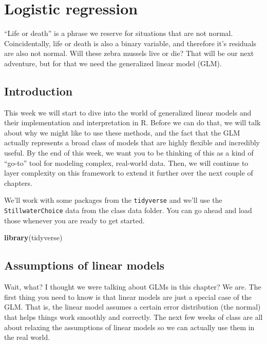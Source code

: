 \documentclass[
]{book}
\newenvironment{Shaded}{\begin{snugshade}}{\end{snugshade}}
\newcommand{\KeywordTok}[1]{\textcolor[rgb]{0.13,0.29,0.53}{\textbf{#1}}}
\newcommand{\NormalTok}[1]{#1}
\begin{document}
\hypertarget{Chapter12}{%
\chapter{Logistic regression}\label{Chapter12}}

``Life or death'' is a phrase we reserve for situations that are not normal. Coincidentally, life or death is also a binary variable, and therefore it's residuals are also not normal. Will these zebra mussels live or die? That will be our next adventure, but for that we need the generalized linear model (GLM).

\hypertarget{intro12}{%
\section{Introduction}\label{intro12}}

This week we will start to dive into the world of generalized linear models and their implementation and interpretation in R. Before we can do that, we will talk about why we might like to use these methods, and the fact that the GLM actually represents a broad class of models that are highly flexible and incredibly useful. By the end of this week, we want you to be thinking of this as a kind of ``go-to'' tool for modeling complex, real-world data. Then, we will continue to layer complexity on this framework to extend it further over the next couple of chapters.

We'll work with some packages from the \texttt{tidyverse} and we'll use the \texttt{StillwaterChoice} data from the class data folder. You can go ahead and load those whenever you are ready to get started.

\begin{Shaded}
\begin{Highlighting}[]
\KeywordTok{library}\NormalTok{(tidyverse)}
\end{Highlighting}
\end{Shaded}

\hypertarget{Assumptions12}{%
\section{Assumptions of linear models}\label{Assumptions12}}

Wait, what? I thought we were talking about GLMs in this chapter? We are. The first thing you need to know is that linear models are just a special case of the GLM. That is, the linear model assumes a certain error distribution (the normal) that helps things work smoothly and correctly. The next few weeks of class are all about relaxing the assumptions of linear models so we can actually use them in the real world.
\end{document}
